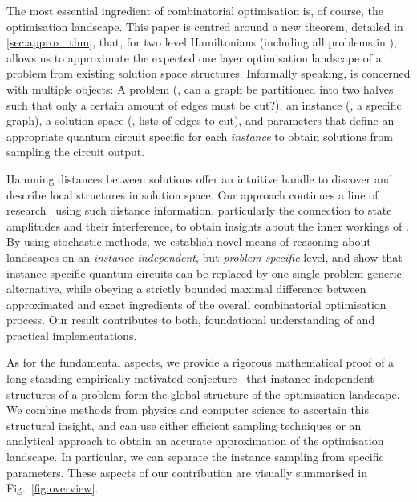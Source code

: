 
The most essential ingredient of combinatorial optimisation is, of course, 
the optimisation landscape. This paper is centred around a new theorem, detailed 
in \cref{sec:approx_thm}, that, for two level Hamiltonians (including all problems 
in \NP), allows us to approximate the expected one layer \QAOA optimisation landscape of a 
problem from existing solution space structures. Informally speaking, 
\QAOA is concerned with multiple objects: A problem (\eg, can a graph be 
partitioned into two halves such that only a certain amount of edges must be 
cut?), an instance (\eg, a specific graph), a solution space (\eg, lists of edges to cut),
and parameters that define an appropriate quantum circuit 
specific for each \emph{instance} to obtain solutions from sampling the circuit output.

Hamming distances between solutions offer an intuitive handle to discover and describe local structures in solution space. Our approach continues
a line of research~\cite{montanez2024towards,diez2024connection,
streif2019comparison,bravyi2020obstacles} using such distance information, particularly the connection to state amplitudes and their interference,
to obtain insights about the inner workings of \QAOA. By using stochastic 
methods, we establish novel means of reasoning about \QAOA landscapes on an \emph{instance 
independent}, but \emph{problem specific} level, and show that 
instance-specific quantum circuits can be replaced by one single 
problem-generic alternative, while obeying a strictly bounded  
maximal difference between approximated and exact ingredients of
the overall combinatorial optimisation process.
% 
Our result contributes to both, foundational understanding
of \QAOA and practical implementations.

As for the fundamental aspects, we provide a rigorous mathematical proof of a long-standing empirically motivated conjecture~\cite{brandao2018fixed,streif2020training,sack2021quantum,galda2similarity,Sud:2024} that instance independent structures of a problem form the global structure of the \QAOA optimisation landscape. We combine methods from physics and computer science to ascertain this structural insight, and can use either efficient sampling techniques or an analytical approach to obtain an accurate approximation of the \QAOA optimisation landscape. In particular, we can separate the instance sampling from specific \QAOA parameters. These aspects of our contribution are visually summarised in Fig.~\ref{fig:overview}.
\newbox\varbox\newbox\databox
\setbox\varbox\hbox{}
\setbox\databox\hbox{}

